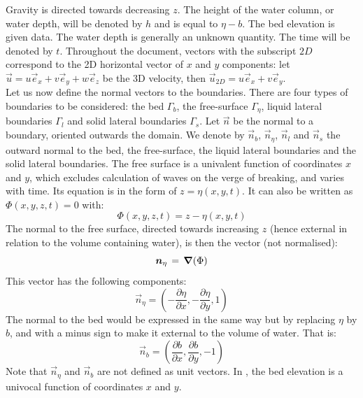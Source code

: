 Gravity is directed towards decreasing $z$.
The height of the water column, or water depth, will be denoted by $h$ and is
equal to $\eta-b$.
The bed elevation is given data. The water depth is generally an unknown quantity.
The time will be denoted by $t$. Throughout the document, vectors with the subscript ${2D}$
correspond to the 2D horizontal vector
of $x$ and $y$ components: let $\vec{u}=u \vec{e}_x+v \vec{e}_y+w\vec{e}_z$ be the 3D velocity, then
$\vec{u}_{2D}= u \vec{e}_x+v \vec{e}_y$.\\

Let us now define the normal vectors to the boundaries.
There are four types of boundaries to be considered: the bed $\Gamma_b$,
the free-surface $\Gamma_\eta$, liquid lateral boundaries $\Gamma_l$ and solid
lateral boundaries $\Gamma_s$. Let $\vec{n}$ be the normal to a boundary, oriented outwards the domain.
We denote by $\vec{n}_b$, $\vec{n}_\eta$, $\vec{n}_l$ and $\vec{n}_s$ the outward normal to the bed,
the free-surface, the liquid lateral boundaries and the solid lateral boundaries.
The free surface is a univalent function of coordinates $x$ and $y$, which
excludes calculation of waves on the verge of breaking, and varies with time.
Its equation is in the form of $z=\eta(x,y,t)$. It can also be written as
$\Phi(x,y,z,t)=0$ with:%
\begin{equation}
  \Phi(x,y,z,t)=z-\eta(x,y,t)
\end{equation}
The normal to the free surface, directed towards increasing $z$ (hence
external in relation to the volume containing water), is then the vector (not normalised):%
\begin{equation}
\bm{n}_{\eta}\,=\,\bm{\nabla}(\Phi)
\end{equation}
This vector has the following components:
\begin{equation}
  \vec{n}_{\eta} =\left(  -\dfrac{\partial \eta}{\partial x},-\dfrac{\partial \eta%
    }{\partial y},1\right)
\end{equation}
The normal to the bed would be expressed in the same way but by replacing
$\eta$ by $b$, and with a minus sign to make it external to the volume of
water. That is:%
\begin{equation}
  \vec{n}_{b}=\left(  \dfrac{\partial b}{\partial x},\dfrac{\partial b%
    }{\partial y},-1\right)
\end{equation}
Note that $\vec{n}_{\eta}$ and $\vec{n}_{b}$ are not defined as unit vectors.
In , the bed elevation is a univocal function of coordinates $x$ and $y$. 

